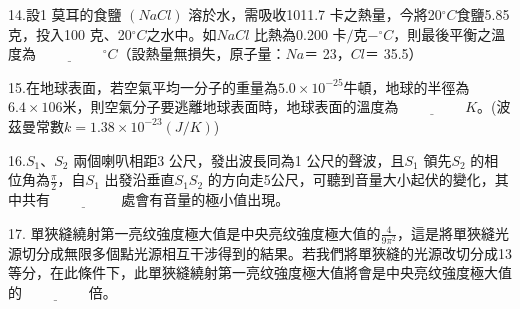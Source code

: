 \documentclass[cn,10pt,math=newtx,chinesefont=founder,device=ig]{elegantbook}
\begin{document}
\newpage

\begin{example}
   14.設1 莫耳的食鹽 $(NaCl)$ 溶於水，需吸收1011.7 卡之熱量，今將20$^\circ C$食鹽5.85 克，投入100 克、20$^\circ C$之水中。如$NaCl$ 比熱為0.200 $卡/克-^\circ C $，則最後平衡之溫度為$\underline{\hspace{2cm}} ^\circ C$（設熱量無損失，原子量：$Na
＝$ 23，$Cl＝$ 35.5）\\
    \rightline{[中壢高中教甄109]}
\end{example}
\begin{solution}
    
\end{solution}

\newpage

\begin{example}
   15.在地球表面，若空氣平均一分子的重量為$5.0\times 10^{-25} $牛頓，地球的半徑為$6.4 \times 106 米$，則空氣分子要逃離地球表面時，地球表面的溫度為$\underline{\hspace{2cm}} K$。(波茲曼常數$k=1.38\times10^{-23} (J/K)$)\\
    \rightline{[中壢高中教甄109]}
\end{example}
\begin{solution}
    
\end{solution}

\newpage

\begin{example}
   16.$S_1、S_2$ 兩個喇叭相距3 公尺，發出波長同為1 公尺的聲波，且$S_1$ 領先$S_2$ 的相位角為$\frac{\pi}{2}$，自$S_1$ 出發沿垂直$S_1 S_2$ 的方向走5公尺，可聽到音量大小起伏的變化，其中共有$\underline{\hspace{2cm}}$ 處會有音量的極小值出現。\\
    \rightline{[中壢高中教甄109]}
\end{example}
\begin{solution}
    
\end{solution}

\newpage

\begin{example}
   17. 單狹縫繞射第一亮纹強度極大值是中央亮纹強度極大值的$\frac{4}{9\pi^2}$，這是將單狹縫光源切分成無限多個點光源相互干涉得到的結果。若我們將單狹縫的光源改切分成13等分，在此條件下，此單狹縫繞射第一亮纹強度極大值將會是中央亮纹強度極大值的$\underline{\hspace{2cm}}$倍。\\
    \rightline{[中壢高中教甄109]}
\end{example}
\begin{solution}
    
\end{solution}
\end{document}
